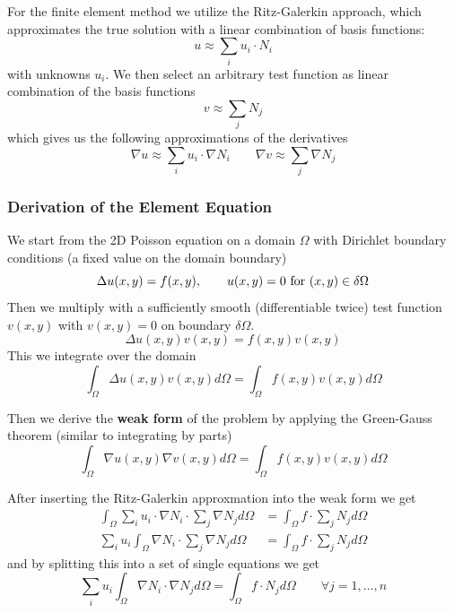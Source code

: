 \documentclass{article}
\begin{document}
For the finite element method we utilize the Ritz-Galerkin approach, which approximates the true solution with a linear combination of basis functions:
\begin{equation}
    u \approx \sum_i u_i \cdot N_i
\end{equation}
with unknowns $u_i$.
We then select an arbitrary test function as linear combination of the basis functions
\begin{equation}
    v \approx \sum_j N_j
\end{equation}
which gives us the following approximations of the derivatives
\begin{equation}
    \nabla u \approx \sum_i u_i \cdot \nabla N_i \qquad \nabla v \approx \sum_j \nabla N_j
\end{equation}


\subsubsection{Derivation of the Element Equation}
We start from the 2D Poisson equation on a domain $\Omega$ with Dirichlet boundary conditions (a fixed value on the domain boundary)
\begin{equation}
    \label{eq:poisson}
    \Delta u(x,y) = f(x,y), \qquad u(x,y) = 0 \textup{ for } (x,y) \in \delta \Omega
\end{equation}
Then we multiply with a sufficiently smooth (differentiable twice)  test function $v(x,y)$ with $v(x,y)=0$ on boundary $\delta \Omega$.
\begin{equation}
    \Delta u(x,y) v(x,y) = f(x,y) v(x,y)
\end{equation}
This we integrate over the domain
\begin{equation}
    \int_\Omega \Delta u(x,y) v(x,y) d\Omega = \int_\Omega f(x,y) v(x,y) d\Omega
\end{equation}

Then we derive the \textbf{weak form} of the problem by applying the Green-Gauss theorem (similar to integrating by parts)
\begin{equation}
    \int_\Omega \nabla u(x,y) \nabla v(x,y) d\Omega = \int_\Omega f(x,y) v(x,y) d\Omega
\end{equation}

After inserting the Ritz-Galerkin approxmation into the weak form we get
\begin{align}
    \int_\Omega \sum_i u_i \cdot \nabla N_i \cdot \sum_j \nabla N_j d\Omega &= \int_\Omega f \cdot \sum_j N_j d\Omega\\
    \sum_i u_i \int_\Omega \nabla N_i \cdot \sum_j \nabla N_j d\Omega &= \int_\Omega f \cdot \sum_j N_j d\Omega
\end{align}
and by splitting this into a set of single equations we get
\begin{equation}
    \sum_i u_i \int_\Omega \nabla N_i \cdot \nabla N_j d\Omega = \int_\Omega f \cdot N_j d\Omega \qquad \forall j=1,...,n
\end{equation}
\end{document}
